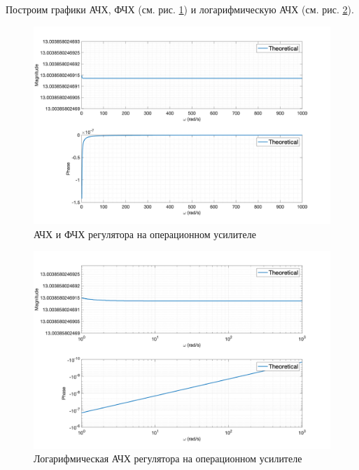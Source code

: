 Построим графики АЧХ, ФЧХ (см. рис. \ref{fig:task5_freq_resp_eq_lin}) и логарифмическую АЧХ (см. рис. \ref{fig:task5_freq_resp_eq_loglog}).
\begin{figure}[ht!]
    \centering
    \includegraphics[width=\textwidth]{media/plots/task5_freq_resp_eq_lin.png}
    \caption{АЧХ и ФЧХ регулятора на операционном усилителе}
    \label{fig:task5_freq_resp_eq_lin}
\end{figure}
\begin{figure}[ht!]
    \centering
    \includegraphics[width=\textwidth]{media/plots/task5_freq_resp_eq_loglog.png}
    \caption{Логарифмическая АЧХ регулятора на операционном усилителе}
    \label{fig:task5_freq_resp_eq_loglog}
\end{figure}

